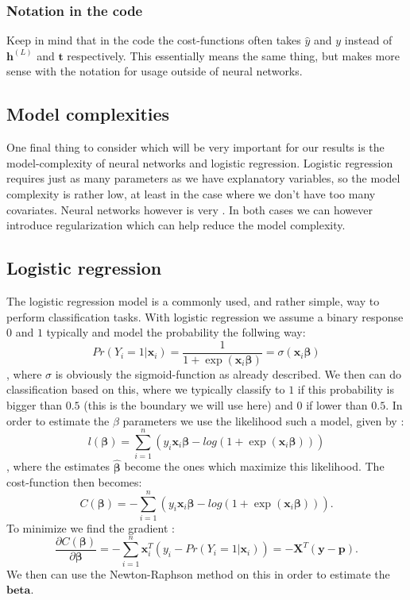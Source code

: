 \documentclass{article}
\begin{document}
\subsubsection{Notation in the code}
Keep in mind that in the code the cost-functions often takes $\hat{y}$ and $y$
instead of $\bm{h}^{(L)}$ and $\bm{t}$ respectively. This essentially means the
same thing, but makes more sense with the notation for usage outside of neural
networks.

\subsection{Model complexities}
One final thing to consider which will be very important for our results is the
model-complexity of neural networks and logistic regression. Logistic regression
requires just as many parameters as we have explanatory variables, so the model
complexity is rather low, at least in the case where we don't have too many
covariates. Neural networks however is very . In both cases we can however
introduce regularization which can help reduce the model complexity.

\subsection{Logistic regression}
The logistic regression model is a commonly used, and rather simple, way to
perform classification tasks. With logistic regression we assume a binary
response $0$ and $1$ typically and model the probability the follwing way:
$$Pr(Y_i = 1 | \bm{x}_i) = \frac{1}{1 + \exp(\bm{x}_i \bm{\beta})} = \sigma(\bm{x}_i \bm{\beta})$$
, where $\sigma$ is obviously the sigmoid-function as already described. We then
can do classification based on this, where we typically classify to $1$ if this
probability is bigger than $0.5$ (this is the boundary we will use here) and $0$
if lower than $0.5$. In order to estimate the $\beta$ parameters we use the
likelihood such a model, given by \cite[s.~4.4]{hastie2009elements}:
$$l(\bm{\beta}) = \sum_{i=1}^{n} (y_i \bm{x}_i \bm{\beta} - log(1 + \exp(\bm{x}_i \bm{\beta})))$$
, where the estimates $\hat{\bm{\beta}}$ become the ones which maximize this
likelihood. The cost-function then becomes:
$$C(\bm{\beta}) = -\sum_{i=1}^{n} (y_i \bm{x}_i \bm{\beta} - log(1 + \exp(\bm{x}_i \bm{\beta}))).$$
To minimize we find the gradient \cite[s.~4.4]{hastie2009elements}:
$$\frac{\partial C(\bm{\beta})}{\partial \bm{\beta}} = -\sum_{i=1}^{n}\bm{x}_i^T(y_i - Pr(Y_i = 1 | \bm{x}_i)) = -\bm{X}^T(\bm{y} - \bm{p}).$$
We then can use the Newton-Raphson method on this in order to estimate the $\bm{beta}$.
\end{document}
